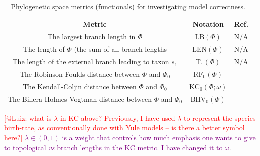 \documentclass[oneside]{article}
\begin{document}
\begin{table}[h]
  \caption{Phylogenetic space metrics (functionals) for investigating model correctness.}
  \label{suptab:dists}
  \centering
  \begin{tabular}{ c|c|c }
    \hline
    Metric & Notation & Ref. \\
    \hline  
    The largest branch length in $\Phi$ & $\text{LB}(\Phi)$ & N/A\\
    The length of $\Phi$ (the sum of all branch lengths & $\text{LEN}(\Phi)$ & N/A\\
    The length of the external branch leading to taxon $s_1$ & $\text{T}_1(\Phi)$ & N/A\\
    The Robinson-Foulds distance between $\Phi$ and $\Phi_0$ & $\text{RF}_0(\Phi)$ & \citep{Robinson1981}\\
    The Kendall-Coljin distance between $\Phi$ and $\Phi_0$ & $\text{KC}_0(\Phi;\omega)$ & \citep{Kendall2016}\\
    The Billera-Holmes-Vogtman distance between $\Phi$ and $\Phi_0$ & $\text{BHV}_0(\Phi)$ & \citep{Billera2001}\\
    \hline
  \end{tabular}
\end{table}

\textcolor{red}{[@Luiz: what is $\lambda$ in KC above? Previously,
     I have used $\lambda$ to represent the species birth-rate, as conventionally
     done with Yule models -- is there a better symbol here?]}
\textcolor{purple}{$\lambda \in (0, 1)$ is a weight that controls how much emphasis one wants to give to topological \textit{vs} branch lengths in the KC metric. I have changed it to $\omega$}.     
     

\end{document}
